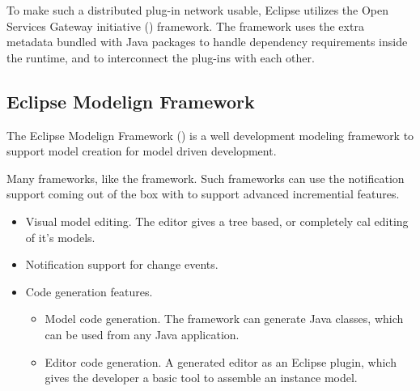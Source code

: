 To make such a distributed plug-in network usable, Eclipse utilizes the Open Services Gateway initiative () framework. The  framework uses the extra metadata bundled with Java packages to handle dependency requirements inside the runtime, and to interconnect the plug-ins with each other.

\subsection{Eclipse Modelign Framework}

The Eclipse Modelign Framework (\emf) is a well development modeling framework to support model creation for model driven development.

Many frameworks, like the \viatra framework. Such frameworks can use the notification support coming out of the box with \emf to support advanced incremential features.

\begin{itemize}
	\item Visual model editing. The \emf editor gives a tree based, or completely cal editing of it's models.
	\item Notification support for change events.
	\item Code generation features.
	      \begin{itemize}
	      	\item Model code generation. The framework can generate Java classes, which can be used from any Java application.
	      	\item Editor code generation. A generated editor as an Eclipse plugin, which gives the developer a basic tool to assemble an instance model.
	      \end{itemize}
\end{itemize}
